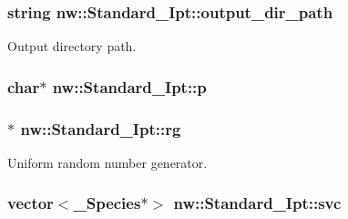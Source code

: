 \hypertarget{classnw_1_1_standard___ipt_a22ca09b593a0438676fd560f168e76f9}{
\subsubsection[{output\+\_\+dir\+\_\+path}]{\setlength{\rightskip}{0pt plus 5cm}string nw\+::\+Standard\+\_\+\+Ipt\+::output\+\_\+dir\+\_\+path\hspace{0.3cm}{\ttfamily [private]}}}\label{classnw_1_1_standard___ipt_a22ca09b593a0438676fd560f168e76f9}


Output directory path. 

\hypertarget{classnw_1_1_standard___ipt_af30a47d8999101d9f83964b5be9f86a5}{
\subsubsection[{p}]{\setlength{\rightskip}{0pt plus 5cm}char$\ast$ nw\+::\+Standard\+\_\+\+Ipt\+::p\hspace{0.3cm}{\ttfamily [private]}}}\label{classnw_1_1_standard___ipt_af30a47d8999101d9f83964b5be9f86a5}
\hypertarget{classnw_1_1_standard___ipt_a18f5e3cad0d5eef81443dfaf8949ba4b}{
\subsubsection[{rg}]{$\ast$ nw\+::\+Standard\+\_\+\+Ipt\+::rg\hspace{0.3cm}{\ttfamily [private]}}}\label{classnw_1_1_standard___ipt_a18f5e3cad0d5eef81443dfaf8949ba4b}


Uniform random number generator. 

\hypertarget{classnw_1_1_standard___ipt_a26fbf039d1232349799194d289febb8d}{
\subsubsection[{svc}]{\setlength{\rightskip}{0pt plus 5cm}vector$<${\bf \+\_\+\+Species}$\ast$$>$ nw\+::\+Standard\+\_\+\+Ipt\+::svc\hspace{0.3cm}{\ttfamily [private]}}}\label{classnw_1_1_standard___ipt_a26fbf039d1232349799194d289febb8d}


